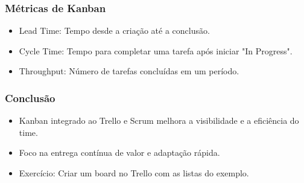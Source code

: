 \documentclass{beamer}
\begin{document}
\begin{frame}
    \frametitle{Métricas de Kanban}
    \begin{itemize}
        \item Lead Time: Tempo desde a criação até a conclusão.
        \item Cycle Time: Tempo para completar uma tarefa após iniciar "In Progress".
        \item Throughput: Número de tarefas concluídas em um período.
    \end{itemize}
\end{frame}

\begin{frame}
    \frametitle{Conclusão}
    \begin{itemize}
        \item Kanban integrado ao Trello e Scrum melhora a visibilidade e a eficiência do time.
        \item Foco na entrega contínua de valor e adaptação rápida.
        \item Exercício: Criar um board no Trello com as listas do exemplo.
    \end{itemize}
\end{frame}
\end{document}
